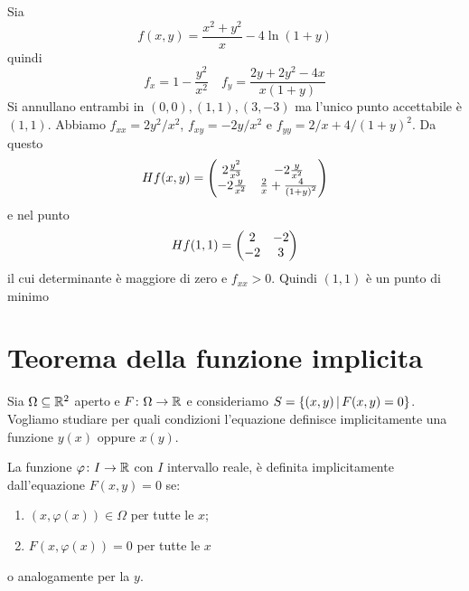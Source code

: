 \documentclass[a4paper]{article}
\begin{document}
\begin{radioactive}
\begin{snippetexample}{}
    Sia \[
        f(x,y) = \frac{x^2 + y^2}{x} - 4\ln(1 + y)
    \]
    quindi
    \[
        f_x = 1 - \frac{y^2}{x^2}
        \quad
        f_y = \frac{2y + 2y^2 - 4x}{x(1 + y)}
    \]
    Si annullano entrambi in \((0,0), (1,1), (3, -3)\) ma l'unico punto accettabile è
    \((1,1)\).
    Abbiamo \(f_{xx} = 2y^2 / x^2\), \(f_{xy} = -2y/x^2\) e \(f_{yy} = 2/x + 4/{(1 + y)}^2\).
    Da questo
    \[
        H f(x,y) = \begin{pmatrix}
            2\frac{y^2}{x^3} & -2\frac{y}{x^2} \\
            -2\frac{y}{x^2} & \frac{2}{x} + \frac{4}{{(1 + y)}^2}
        \end{pmatrix}
    \]
    e nel punto
    \[
        H f(1,1) = \begin{pmatrix}
            2 & -2 \\ -2 & 3
        \end{pmatrix}
    \]
    il cui determinante è maggiore di zero e \(f_{xx} > 0\).
    Quindi \((1,1)\) è un punto di minimo
\end{snippetexample}
\end{radioactive}

\pagebreak

\section{Teorema della funzione implicita}

\begin{radioactive}
Sia \(\Omega \subseteq \mathbb{R}^2\) aperto e \(F\colon \Omega \to \mathbb{R}\)
e consideriamo \(S = \{(x,y) \,|\, F(x,y) = 0\}\).
Vogliamo studiare per quali condizioni
l'equazione definisce implicitamente una funzione \(y(x)\)
oppure \(x(y)\).

\begin{snippetdefinition}{}
    La funzione \(\varphi \colon I \to \mathbb{R}\) con \(I\) intervallo reale,
    è definita implicitamente dall'equazione \(F(x,y) = 0\) se:
    \begin{enumerate}
        \item \((x, \varphi(x)) \in \Omega\) per tutte le \(x\);
        \item \(F(x, \varphi(x)) = 0\) per tutte le \(x\)
    \end{enumerate}
    o analogamente per la \(y\).
\end{snippetdefinition}
\end{radioactive}
\end{document}
